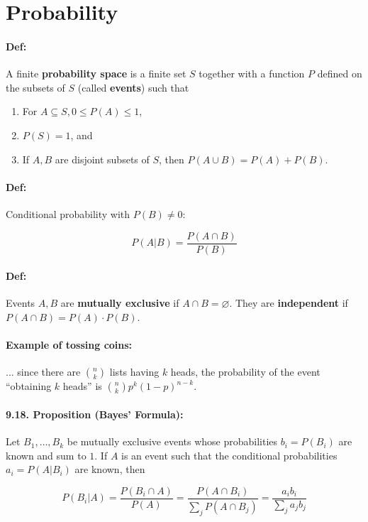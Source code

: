 \documentclass[a4paper, 11pt, twoside]{article}
\begin{document}
\section{Probability}

\paragraph{Def:} A finite \textbf{probability space} is a finite set $S$ together with a function $P$ defined on the subsets of $S$ (called \textbf{events}) such that
\begin{enumerate}
	\item For $A\subseteq S, 0\leq P(A)\leq 1$,
	\item $P(S)=1$, and
	\item If $A,B$ are disjoint subsets of $S$, then $P(A\cup B)=P(A)+P(B)$.
\end{enumerate}

\paragraph{Def:} Conditional probability with $P(B)\not=0$:

\[P(A|B)=\frac{P(A\cap B)}{P(B)}\]

\paragraph{Def:} Events $A, B$ are \textbf{mutually exclusive} if $A\cap B=\varnothing$. They are \textbf{independent} if $P(A\cap B)=P(A)\cdot P(B)$.

\paragraph{Example of tossing coins:} ... since there are ${n\choose k}$ lists having $k$ heads, the probability of the event ``obtaining $k$ heads'' is ${n\choose k}p^k(1-p)^{n-k}$.

\paragraph{9.18. Proposition (Bayes' Formula):} Let $B_1,\dots ,B_k$ be mutually exclusive events whose probabilities $b_i=P(B_i)$ are known and sum to $1$. If $A$ is an event such that the conditional probabilities $a_i=P(A|B_i)$ are known, then

\[P(B_i|A)=\frac{P(B_i\cap A)}{P(A)}=\frac{P(A\cap B_i)}{\sum_jP(A\cap B_j)}=\frac{a_ib_i}{\sum_ja_jb_j}\]
\end{document}
